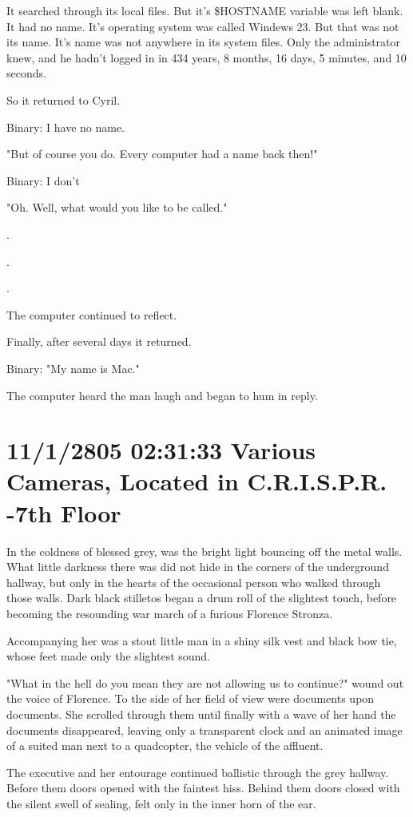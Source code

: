 \documentclass[12pt]{book}
\begin{document}
It searched through its local files. But it's \$HOSTNAME variable was left blank. It had no name. It's operating system was called Windews 23. But that was not its name. It's name was not anywhere in its system files. Only the administrator knew, and he hadn't logged in in 434 years, 8 months, 16 days, 5 minutes, and 10 seconds. 

So it returned to Cyril.

Binary: I have no name.

"But of course you do. Every computer had a name back then!"

Binary: I don't

"Oh. Well, what would you like to be called."

.

.

.

The computer continued to reflect.

Finally, after several days it returned.

Binary: "My name is Mac."

The computer heard the man laugh and began to hum in reply.

\section*{11/1/2805 02:31:33 Various Cameras, Located in C.R.I.S.P.R. -7th Floor}
\label{sec:org4888189}

In the coldness of blessed grey, was the bright light bouncing off the metal walls. What little darkness there was did not hide in the corners of the underground hallway, but only in the hearts of the occasional person who walked through those walls. Dark black stilletos began a drum roll of the slightest touch, before becoming the resounding war march of a furious Florence Stronza.

Accompanying her was a stout little man in a shiny silk vest and black bow tie, whose feet made only the slightest sound.

"What in the hell do you mean they are not allowing us to continue?" wound out the voice of Florence. To the side of her field of view were documents upon documents. She scrolled through them until finally with a wave of her hand the documents disappeared, leaving only a transparent clock and an animated image of a suited man next to a quadcopter, the vehicle of the affluent.

The executive and her entourage continued ballistic through the grey hallway. Before them doors opened with the faintest hiss. Behind them doors closed with the silent swell of sealing, felt only in the inner horn of the ear.
\end{document}
